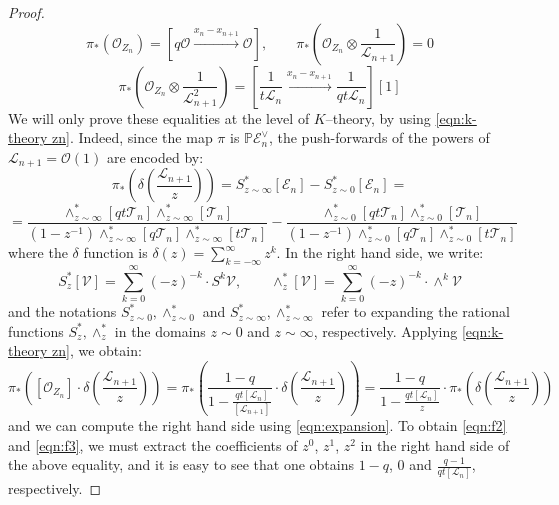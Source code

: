 \documentclass[12pt]{amsart}
\numberwithin{equation}{section}
\theoremstyle{definition}
\theoremstyle{remark}
\newcommand{\PP}{\mathbb{P}}
\newcommand{\CE}{\mathcal{E}}
\newcommand{\CL}{\mathcal{L}}
\newcommand{\CO}{\mathcal{O}}
\newcommand{\CT}{\mathcal{T}}
\newcommand{\CV}{\mathcal{V}}
\renewcommand{\1}{\mathbf{1}}
\begin{document}
\begin{proof}
\begin{equation}
\label{eqn:f2}
\pi_*(\CO_{Z_n}) = \left[q\CO \xrightarrow{x_n-x_{n+1}}\CO \right], \qquad \pi_* \left(\CO_{Z_n} \otimes \frac 1{\CL_{n+1}} \right) = 0 %
\end{equation}
\begin{equation}
\label{eqn:f3}
\pi_* \left(\CO_{Z_n} \otimes \frac 1{\CL^2_{n+1}} \right) = \left[\frac 1{t \CL_n} \xrightarrow{x_n-x_{n+1}} \frac 1{qt \CL_n} \right][1]
\end{equation}
We will only prove these equalities at the level of $K$--theory, by using \eqref{eqn:k-theory zn}. Indeed, since the map $\pi$ is $\PP \CE^\vee_n$, the push-forwards of the powers of $\CL_{n+1} = \CO(1)$ are encoded by:
\begin{equation}
\label{eqn:expansion}
\pi_* \left( \delta\left(\frac {\CL_{n+1}}z \right) \right) = S^*_{z \sim \infty} [\CE_n] - S^*_{z \sim 0} [\CE_n] = 
\end{equation}
$$
= \frac {\wedge^*_{z \sim \infty} [qt\CT_n] \wedge^*_{z \sim \infty} [\CT_n]}{(1-z^{-1})\wedge^*_{z \sim \infty} [q\CT_n] \wedge^*_{z \sim \infty} [t\CT_n]} - \frac {\wedge^*_{z \sim 0} [qt\CT_n] \wedge^*_{z \sim 0} [\CT_n]}{(1-z^{-1})\wedge^*_{z \sim 0} [q\CT_n] \wedge^*_{z \sim 0} [t\CT_n]}
$$
where the $\delta$ function is $\delta(z) = \sum_{k=-\infty}^{\infty} z^k$. In the right hand side, we write:
$$
S^*_z[\CV] = \sum_{k=0}^\infty (-z)^{-k} \cdot S^k\CV, \qquad \wedge^*_z[\CV] = \sum_{k=0}^\infty (-z)^{-k} \cdot \wedge^k\CV
$$
and the notations $S^*_{z\sim 0}, \wedge^*_{z\sim 0}$ and $S^*_{z\sim \infty}, \wedge^*_{z\sim \infty}$ refer to expanding the rational functions $S^*_z, \wedge^*_z$ in the domains $z\sim 0$ and $z\sim \infty$, respectively. Applying \eqref{eqn:k-theory zn}, we obtain:
$$
\pi_*\left( [\CO_{Z_n}] \cdot \delta\left(\frac {\CL_{n+1}}z \right) \right) = \pi_*\left( \frac {1-q}{1-\frac {qt[\CL_n]}{[\CL_{n+1}]}} \cdot \delta\left(\frac {\CL_{n+1}}z \right) \right) = \frac {1-q}{1-\frac {qt[\CL_n]}z} \cdot \pi_* \left( \delta\left(\frac {\CL_{n+1}}z \right) \right)
$$
and we can compute the right hand side using \eqref{eqn:expansion}. To obtain \eqref{eqn:f2} and \eqref{eqn:f3}, we must extract the coefficients of $z^0$, $z^{1}$, $z^2$ in the right hand side of the above equality, and it is easy to see that one obtains $1-q$, $0$ and $\frac {q-1}{qt[\CL_n]}$, respectively.
\end{proof}
\end{document}
